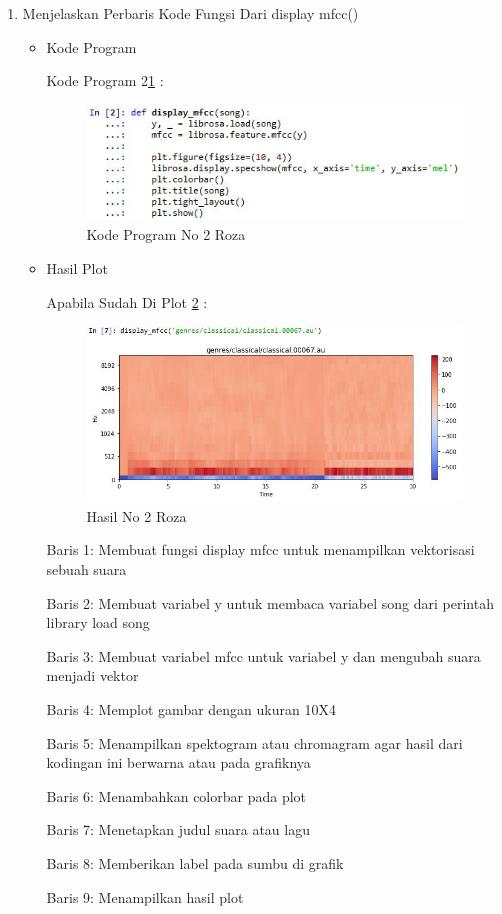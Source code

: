 \begin{enumerate}
\item Menjelaskan Perbaris Kode Fungsi Dari display mfcc()
\begin{itemize}
\item Kode Program

\par Kode Program 2\ref{kpno2} :
\begin{figure}[!hbtp]
\centering
\includegraphics[scale=0.7]{figures/kodeprogram2roza.jpg}
\caption{Kode Program No 2 Roza}
\label{kpno2}
\end{figure}
\end{itemize}
\begin{itemize}
\item Hasil Plot
\par Apabila Sudah Di Plot \ref{hasil2} :
\begin{figure}[!hbtp]
\centering
\includegraphics[scale=0.7]{figures/no2roza.jpg}
\caption{Hasil No 2 Roza}
\label{hasil2}
\end{figure}
\par  Baris 1: Membuat fungsi display mfcc untuk menampilkan vektorisasi sebuah suara
\par  Baris 2: Membuat variabel y untuk membaca variabel song dari perintah library load song
\par  Baris 3: Membuat variabel mfcc untuk variabel y dan mengubah suara menjadi vektor
\par  Baris 4: Memplot gambar dengan ukuran 10X4
\par  Baris 5: Menampilkan spektogram atau chromagram agar hasil dari kodingan ini berwarna atau pada grafiknya
\par  Baris 6: Menambahkan colorbar pada plot
\par  Baris 7: Menetapkan judul suara atau lagu
\par  Baris 8: Memberikan label pada sumbu di grafik
\par  Baris 9: Menampilkan hasil plot
\end{itemize}
\par


\end{enumerate}
